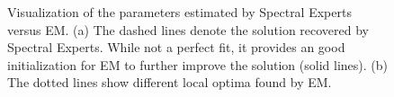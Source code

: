 \begin{figure}[p]
  \centering
    \hspace{-2em}
  \caption{Visualization of the parameters estimated by Spectral Experts versus EM.
  (a) The dashed lines denote the solution recovered by Spectral Experts. While
  not a perfect fit, it provides an good initialization for EM to further improve the solution (solid lines).
  (b) The dotted lines show different local optima found by EM.}
  \label{fig:curves}
\end{figure}



